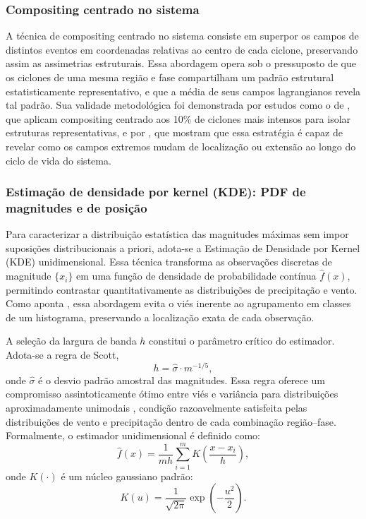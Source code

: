 \subsubsection{Compositing centrado no sistema}\label{subsubsec:tb_compositing}

A técnica de compositing centrado no sistema consiste em superpor os campos de distintos eventos em coordenadas relativas ao centro de cada ciclone, preservando assim as assimetrias estruturais.
Essa abordagem opera sob o pressuposto de que os ciclones de uma mesma região e fase compartilham um padrão estrutural estatisticamente representativo, e que a média de seus campos lagrangianos revela tal padrão.
Sua validade metodológica foi demonstrada por estudos como o de \citet{priestley2022improved}, que aplicam compositing centrado aos 10\% de ciclones mais intensos para isolar estruturas representativas, e por \citet{han2025system}, que mostram que essa estratégia é capaz de revelar como os campos extremos mudam de localização ou extensão ao longo do ciclo de vida do sistema.

\subsubsection{Estimação de densidade por kernel (KDE): PDF de magnitudes e de posição}\label{subsubsec:tb_kde}

Para caracterizar a distribuição estatística das magnitudes máximas sem impor suposições distribucionais a priori, adota-se a Estimação de Densidade por Kernel (KDE) unidimensional.
Essa técnica transforma as observações discretas de magnitude $\{x_i\}$ em uma função de densidade de probabilidade contínua $\hat{f}(x)$, permitindo contrastar quantitativamente as distribuições de precipitação e vento.
Como aponta \citet{weglarczyk2018kernel}, essa abordagem evita o viés inerente ao agrupamento em classes de um histograma, preservando a localização exata de cada observação.

A seleção da largura de banda $h$ constitui o parâmetro crítico do estimador. Adota-se a regra de Scott,
\begin{equation}\label{eq:scott_rule}
h = \hat{\sigma} \cdot m^{-1/5},
\end{equation}
onde $\hat{\sigma}$ é o desvio padrão amostral das magnitudes.
Essa regra oferece um compromisso assintoticamente ótimo entre viés e variância para distribuições aproximadamente unimodais \citep{weglarczyk2018kernel}, condição razoavelmente satisfeita pelas distribuições de vento e precipitação dentro de cada combinação região--fase.
Formalmente, o estimador unidimensional é definido como:
\begin{equation}\label{eq:tb_kde_pdf}
\hat{f}(x) = \frac{1}{m h} \sum_{i=1}^{m} K\!\left(\frac{x - x_i}{h}\right),
\end{equation}
onde $K(\cdot)$ é um núcleo gaussiano padrão:
\begin{equation}\label{eq:tb_gaussian_kernel}
K(u) = \frac{1}{\sqrt{2\pi}} \exp\!\left(-\frac{u^2}{2}\right).
\end{equation}

